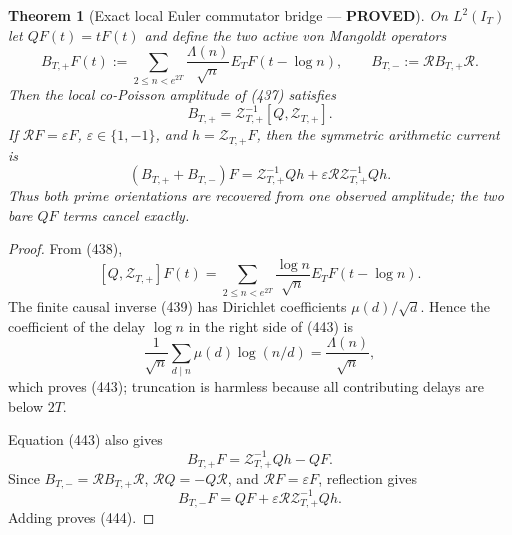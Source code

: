 \documentclass[11pt]{article}
\newtheorem{theorem}{Theorem}
\newcommand{\PROVED}{\textcolor{green!45!black}{\textbf{PROVED}}}
\begin{document}
\begin{theorem}[Exact local Euler commutator bridge --- \PROVED]
On $L^2(I_T)$ let $QF(t)=tF(t)$ and define the two active von Mangoldt
operators
\begin{equation}
 B_{T,+}F(t):=\sum_{2\le n<e^{2T}}
       \frac{\Lambda(n)}{\sqrt n}E_TF(t-\log n),
 \qquad B_{T,-}:=\mathcal RB_{T,+}\mathcal R.       \tag{442}
\end{equation}
Then the local co-Poisson amplitude of (437) satisfies
\begin{equation}
 \boxed{
 B_{T,+}=\mathcal Z_{T,+}^{-1}[Q,\mathcal Z_{T,+}].} \tag{443}
\end{equation}
If $\mathcal RF=\varepsilon F$, $\varepsilon\in\{1,-1\}$, and
$h=\mathcal Z_{T,+}F$, then the symmetric arithmetic current is
\begin{equation}
 \boxed{
 (B_{T,+}+B_{T,-})F
 =\mathcal Z_{T,+}^{-1}Qh
  +\varepsilon\mathcal R\mathcal Z_{T,+}^{-1}Qh.}  \tag{444}
\end{equation}
Thus both prime orientations are recovered from one observed amplitude;
the two bare $QF$ terms cancel exactly.
\end{theorem}

\begin{proof}
From (438),
\[
 [Q,\mathcal Z_{T,+}]F(t)
 =\sum_{2\le n<e^{2T}}
   \frac{\log n}{\sqrt n}E_TF(t-\log n).
\]
The finite causal inverse (439) has Dirichlet coefficients
$\mu(d)/\sqrt d$.  Hence the coefficient of the delay $\log n$ in the
right side of (443) is
\[
 \frac1{\sqrt n}\sum_{d\mid n}\mu(d)\log(n/d)
 =\frac{\Lambda(n)}{\sqrt n},
\]
which proves (443); truncation is harmless because all contributing delays
are below $2T$.

Equation (443) also gives
\[
 B_{T,+}F=\mathcal Z_{T,+}^{-1}Qh-QF.
\]
Since $B_{T,-}=\mathcal RB_{T,+}\mathcal R$,
$\mathcal RQ=-Q\mathcal R$, and $\mathcal RF=\varepsilon F$, reflection
gives
\[
 B_{T,-}F=QF+\varepsilon
 \mathcal R\mathcal Z_{T,+}^{-1}Qh.
\]
Adding proves (444).
\end{proof}
\end{document}
